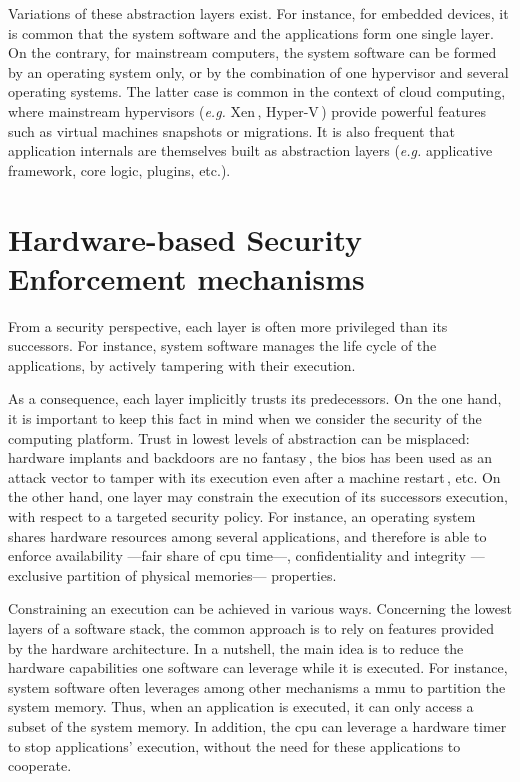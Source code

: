 Variations of these abstraction layers exist.
%
For instance, for embedded devices, it is common that the system software and
the applications form one single layer.
%
On the contrary, for mainstream computers, the system software can be formed by
an operating system only, or by the combination of one hypervisor and several
operating systems.
%
The latter case is common in the context of cloud computing, where mainstream
hypervisors (\emph{e.g.} Xen\,\cite{barham2003xen},
Hyper-V\,\cite{velte2009hyperv}) provide powerful features such as virtual
machines snapshots or migrations.
%
It is also frequent that application internals are themselves built as
abstraction layers (\emph{e.g.} applicative framework, core logic, plugins,
etc.).


\section{Hardware-based Security Enforcement mechanisms}

From a security perspective, each layer is often more privileged than its
successors.
%
For instance, system software manages the life cycle of the applications, by
actively tampering with their execution.

As a consequence, each layer implicitly trusts its predecessors.
%
On the one hand, it is important to keep this fact in mind when we consider the
security of the computing platform.
%
Trust in lowest levels of abstraction can be misplaced: hardware implants and
backdoors are no fantasy\,\cite{yang2016a2}, the \ac{bios} has been used as an
attack vector to tamper with its execution even after a machine
restart\,\cite{embleton2013smm}, etc.
%
On the other hand, one layer may constrain the execution of its successors
execution, with respect to a targeted security policy.
%
For instance, an operating system shares hardware resources among several
applications, and therefore is able to enforce availability ---fair share of
\ac{cpu} time---, confidentiality and integrity ---exclusive partition of
physical memories--- properties.

Constraining an execution can be achieved in various ways.
%
Concerning the lowest layers of a software stack, the common approach is to rely
on features provided by the hardware architecture.
%
In a nutshell, the main idea is to reduce the hardware capabilities one software
can leverage while it is executed.
%
For instance, system software often leverages among other mechanisms a \ac{mmu}
to partition the system memory.
%
Thus, when an application is executed, it can only access a subset of the system
memory.
%
In addition, the \ac{cpu} can leverage a hardware timer to stop applications'
execution, without the need for these applications to cooperate.

